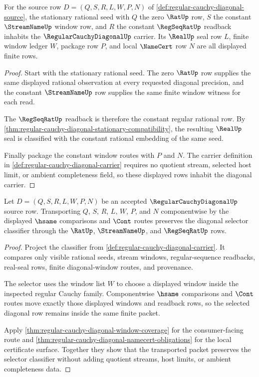 \begin{theorem}
\label{thm:regular-cauchy-diagonal-zero-seed}
For the source row $D=(Q,S,R,L,W,P,N)$ of \autoref{def:regular-cauchy-diagonal-source}, the stationary rational seed with $Q$ the zero $\RatUp$ row, $S$ the constant $\StreamNameUp$ window row, and $R$ the constant $\RegSeqRatUp$ readback inhabits the $\RegularCauchyDiagonalUp$ carrier. Its $\RealUp$ seal row $L$, finite window ledger $W$, package row $P$, and local $\NameCert$ row $N$ are all displayed finite rows.
\end{theorem}
\begin{proof}
Start with the stationary rational seed. The zero $\RatUp$ row supplies the same displayed rational observation at every requested diagonal precision, and the constant $\StreamNameUp$ row supplies the same finite window witness for each read.

The $\RegSeqRatUp$ readback is therefore the constant regular rational row. By \autoref{thm:regular-cauchy-diagonal-stationary-compatibility}, the resulting $\RealUp$ seal is classified with the constant rational embedding of the same seed.

Finally package the constant window routes with $P$ and $N$. The carrier definition in \autoref{def:regular-cauchy-diagonal-carrier} requires no quotient stream, selected host limit, or ambient completeness field, so these displayed rows inhabit the diagonal carrier.
\end{proof}

\begin{theorem}
\label{thm:regular-cauchy-diagonal-selector-stability}
Let $D=(Q,S,R,L,W,P,N)$ be an accepted $\RegularCauchyDiagonalUp$ source row. Transporting $Q$, $S$, $R$, $L$, $W$, $P$, and $N$ componentwise by the displayed $\hsame$ comparisons and $\Cont$ routes preserves the diagonal selector classifier through the $\RatUp$, $\StreamNameUp$, and $\RegSeqRatUp$ rows.
\end{theorem}
\begin{proof}
Project the classifier from \autoref{def:regular-cauchy-diagonal-carrier}. It compares only visible rational seeds, stream windows, regular-sequence readbacks, real-seal rows, finite diagonal-window routes, and provenance.

The selector uses the window list $W$ to choose a displayed window inside the inspected regular Cauchy family. Componentwise $\hsame$ comparisons and $\Cont$ routes move exactly those displayed windows and readback rows, so the selected diagonal row remains inside the same finite packet.

Apply \autoref{thm:regular-cauchy-diagonal-window-coverage} for the consumer-facing route and \autoref{thm:regular-cauchy-diagonal-namecert-obligations} for the local certificate surface. Together they show that the transported packet preserves the selector classifier without adding quotient streams, host limits, or ambient completeness data.
\end{proof}

